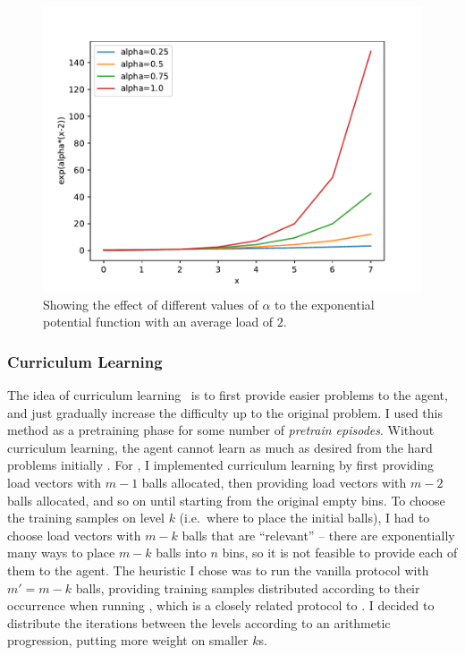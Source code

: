 \begin{figure}[hbt!] \label{exponential-potential-alpha}
    \centering
    \includegraphics[scale=0.7]{Chapter3/Figs/exponential_potential_analysis.pdf}
    \caption{Showing the effect of different values of $\alpha$ to the exponential potential function with an average load of $2$.}
\end{figure}



\subsubsection{Curriculum Learning}


The idea of curriculum learning~\cite{bengio2009curriculumoriginal} is to first provide easier problems to the agent, and just gradually increase the difficulty up to the original problem. I used this method as a pretraining phase for some number of \textit{pretrain episodes}. Without curriculum learning, the agent cannot learn as much as desired from the hard problems initially . For \TwoThinning, I implemented curriculum learning by first providing load vectors with $m-1$ balls allocated, then providing load vectors with $m-2$ balls allocated, and so on until starting from the original empty bins. To choose the training samples on level $k$ (i.e.\ where to place the initial balls), I had to choose load vectors with $m-k$ balls that are ``relevant'' -- there are exponentially many ways to place $m-k$ balls into $n$ bins, so it is not feasible to provide each of them to the agent. The heuristic I chose was to run the vanilla \OneChoice protocol with $m'=m-k$ balls, providing training samples distributed according to their occurrence when running \OneChoice, which is a closely related protocol to \TwoThinning. I decided to distribute the iterations between the levels according to an arithmetic progression, putting more weight on smaller $k$s.




